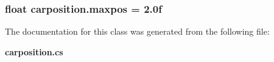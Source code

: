 \subsubsection[{maxpos}]{\setlength{\rightskip}{0pt plus 5cm}float carposition.\+maxpos = 2.\+0f}\label{classcarposition_accb0a856408bae0e247f633656ee24f7}


The documentation for this class was generated from the following file\+:\begin{DoxyCompactItemize}
\item 
{\bf carposition.\+cs}\end{DoxyCompactItemize}
